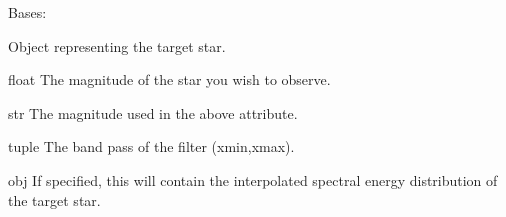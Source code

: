 \documentclass[letterpaper,10pt,english]{sphinxmanual}
\begin{document}
\begin{fulllineitems}
\label{\detokenize{modules:signal_to_noise.Target}}
Bases: 

Object representing the target star.

\begin{fulllineitems}
\label{\detokenize{modules:signal_to_noise.Target.magnitude}}
float
The magnitude of the star you wish to observe.

\end{fulllineitems}


\begin{fulllineitems}
\label{\detokenize{modules:signal_to_noise.Target.magnitude_system}}
str
The magnitude used in the above attribute.

\end{fulllineitems}


\begin{fulllineitems}
\label{\detokenize{modules:signal_to_noise.Target.filter_range}}
tuple
The band pass of the filter (xmin,xmax).

\end{fulllineitems}


\begin{fulllineitems}
\label{\detokenize{modules:signal_to_noise.Target.SED}}
obj
If specified, this will contain the interpolated spectral energy distribution
of the target star.


\end{fulllineitems}
\end{fulllineitems}
\end{document}
